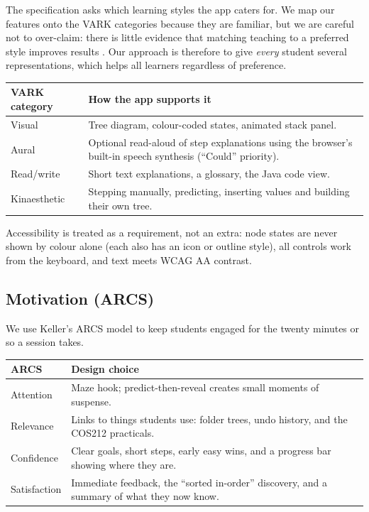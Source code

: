 \documentclass[11pt,a4paper]{article}
\begin{document}
The specification asks which learning styles the app caters for. We map our features onto the
VARK categories because they are familiar, but we are careful not to over-claim: there is little
evidence that matching teaching to a preferred style improves results \cite{pashler2008}. Our
approach is therefore to give \emph{every} student several representations, which helps all
learners regardless of preference.

\begin{tabularx}{\textwidth}{@{}l L@{}}
  \toprule
  \textbf{VARK category} & \textbf{How the app supports it} \\
  \midrule
  Visual      & Tree diagram, colour-coded states, animated stack panel. \\
  Aural       & Optional read-aloud of step explanations using the browser's built-in speech
                synthesis (``Could'' priority). \\
  Read/write  & Short text explanations, a glossary, the Java code view. \\
  Kinaesthetic & Stepping manually, predicting, inserting values and building their own tree. \\
  \bottomrule
\end{tabularx}

Accessibility is treated as a requirement, not an extra: node states are never shown by colour
alone (each also has an icon or outline style), all controls work from the keyboard, and text
meets WCAG AA contrast.

\subsection{Motivation (ARCS)}

We use Keller's ARCS model \cite{keller1987} to keep students engaged for the twenty minutes or so a
session takes.

\begin{tabularx}{\textwidth}{@{}l L@{}}
  \toprule
  \textbf{ARCS} & \textbf{Design choice} \\
  \midrule
  Attention    & Maze hook; predict-then-reveal creates small moments of suspense. \\
  Relevance    & Links to things students use: folder trees, undo history, and the COS212 practicals. \\
  Confidence   & Clear goals, short steps, early easy wins, and a progress bar showing where they are. \\
  Satisfaction & Immediate feedback, the ``sorted in-order'' discovery, and a summary of what they now know. \\
  \bottomrule
\end{tabularx}
\end{document}
